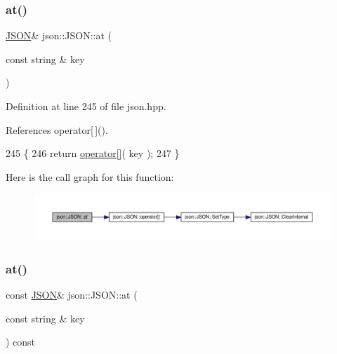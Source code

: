 \subsubsection{\texorpdfstring{at()}{at()}\hspace{0.1cm}{\footnotesize\ttfamily [1/4]}}
{\footnotesize\ttfamily \mbox{\hyperlink{classjson_1_1_j_s_o_n}{J\+S\+ON}}\& json\+::\+J\+S\+O\+N\+::at (\begin{DoxyParamCaption}\item[{const string \&}]{key }\end{DoxyParamCaption})\hspace{0.3cm}{\ttfamily [inline]}}



Definition at line 245 of file json.\+hpp.



References operator\mbox{[}$\,$\mbox{]}().


\begin{DoxyCode}
245                                       \{
246             \textcolor{keywordflow}{return} \mbox{\hyperlink{classjson_1_1_j_s_o_n_a29c695c67a5b34a3b59af0da3c25d6b1}{operator[]}}( key );
247         \}
\end{DoxyCode}
Here is the call graph for this function\+:
\nopagebreak
\begin{figure}[H]
\begin{center}
\leavevmode
\includegraphics[width=350pt]{classjson_1_1_j_s_o_n_a0980eee524bf7442d5f00612984c89c4_cgraph}
\end{center}
\end{figure}
\mbox{\label{classjson_1_1_j_s_o_n_a7c52c700576374ccab54e006bae06c55}} 
\subsubsection{\texorpdfstring{at()}{at()}\hspace{0.1cm}{\footnotesize\ttfamily [2/4]}}
{\footnotesize\ttfamily const \mbox{\hyperlink{classjson_1_1_j_s_o_n}{J\+S\+ON}}\& json\+::\+J\+S\+O\+N\+::at (\begin{DoxyParamCaption}\item[{const string \&}]{key }\end{DoxyParamCaption}) const\hspace{0.3cm}{\ttfamily [inline]}}




